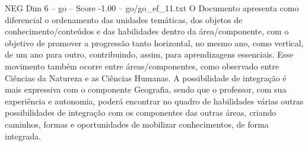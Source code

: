 \begin{textsample}{NEG Dim 6 – go – Score -1.00 – go/go\_ef\_11.txt}
O Documento apresenta como diferencial o ordenamento das unidades temáticas, dos objetos de conhecimento/conteúdos e das habilidades dentro da área/componente, com o objetivo de promover a progressão tanto horizontal, no mesmo ano, como vertical, de um ano para outro, contribuindo, assim, para aprendizagens essenciais.
Esse movimento também ocorre entre áreas/componentes, como observado entre Ciências da Natureza e as Ciências Humanas.
A possibilidade de integração é mais expressiva com o componente Geografia, sendo que o professor, com sua experiência e autonomia, poderá encontrar no quadro de habilidades várias outras possibilidades de integração com os componentes das outras áreas, criando caminhos, formas e oportunidades de mobilizar conhecimentos, de forma integrada.

\end{textsample}
